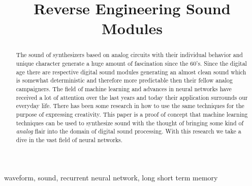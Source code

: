 \documentclass[conference]{IEEEtran}
\begin{document}
\title{Reverse Engineering Sound Modules}


\author{
}




\maketitle

\begin{abstract}
The sound of synthesizers based on analog circuits with their individual behavior and unique character generate a huge amount of fascination since the 60's.
Since the digital age there are respective digital sound modules generating an almost clean sound which is somewhat deterministic and therefore more predictable then their fellow analog campaigners.
The field of machine learning and advances in neural networks have received a lot of attention over the last years and today their application surrounds our everyday life.
There has been some research in how to use the same techniques for the purpose of expressing creativity.
This paper is a proof of concept that machine learning techniques can be used to synthesize sound with the thought of bringing some kind of \textit{analog} flair into the domain of digital sound processing.
With this research we take a dive in the vast field of neural networks.
\end{abstract}

\begin{IEEEkeywords}
  waveform, sound, recurrent neural network, long short term memory
\end{IEEEkeywords}
\end{document}
